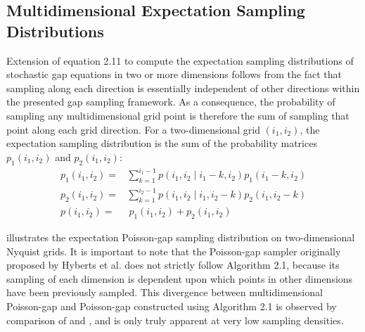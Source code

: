 \subsection{Multidimensional Expectation Sampling Distributions}

\begin{doublespace}
Extension of equation 2.11 to compute the expectation sampling distributions
of stochastic gap equations in two or more dimensions follows from the fact
that sampling along each direction is essentially independent of other
directions within the presented gap sampling framework. As a consequence,
the probability of sampling any multidimensional grid point is therefore the
sum of sampling that point along each grid direction. For a two-dimensional
grid $(i_1,i_2)$, the expectation sampling distribution is the sum of the
probability matrices $p_1(i_1,i_2)$ and $p_2(i_1,i_2)$:
\begin{align}
p_1(i_1,i_2) =& \sum_{k=1}^{i_1-1} p(i_1,i_2 \mid i_1-k,i_2) p_1(i_1-k,i_2)
 \nonumber \\
p_2(i_1,i_2) =& \sum_{k=1}^{i_2-1} p(i_1,i_2 \mid i_1,i_2-k) p_2(i_1,i_2-k)
 \nonumber \\
p(i_1,i_2) =&\: p_1(i_1,i_2) + p_2(i_1,i_2)
\end{align}

 illustrates the expectation Poisson-gap sampling
distribution on two-dimensional Nyquist grids. It is important to note that
the Poisson-gap sampler originally proposed by Hyberts et al. does not
strictly follow Algorithm 2.1, because its sampling of each dimension is
dependent upon which points in other dimensions have been previously sampled.
This divergence between multidimensional Poisson-gap and Poisson-gap
constructed using Algorithm 2.1 is observed by comparison of
 and , and is only
truly apparent at very low sampling densities.
\end{doublespace}

